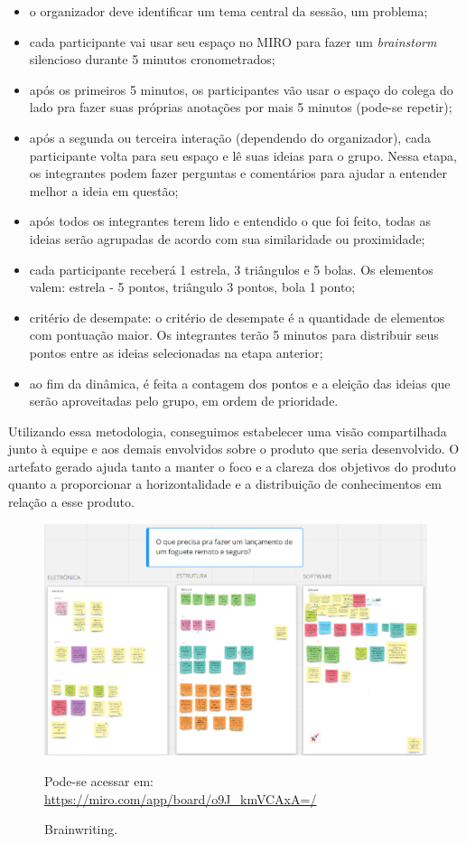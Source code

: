 \begin{itemize}
\item o organizador deve identificar um tema central da sessão, um problema;
\item cada participante vai usar seu espaço no MIRO para fazer um \textit{brainstorm} silencioso durante 5 minutos cronometrados;
\item após os primeiros 5 minutos, os participantes vão usar o espaço do colega do lado pra fazer suas próprias anotações por mais 5 minutos (pode-se repetir);
\item após a segunda ou terceira interação (dependendo do organizador), cada participante volta para seu espaço e lê suas ideias para o grupo. Nessa etapa, os integrantes podem fazer perguntas e comentários para ajudar a entender melhor a ideia em questão;
\item após todos os integrantes terem lido e entendido o que foi feito, todas as ideias serão agrupadas de acordo com sua similaridade ou proximidade;
\item cada participante receberá 1 estrela, 3 triângulos e 5 bolas. Os elementos valem: estrela - 5 pontos, triângulo 3 pontos, bola 1 ponto;
\item critério de desempate: o critério de desempate é a quantidade de elementos com pontuação maior. Os integrantes terão 5 minutos para distribuir seus pontos entre as ideias selecionadas na etapa anterior;
\item ao fim da dinâmica, é feita a contagem dos pontos e a eleição das ideias que serão aproveitadas pelo grupo, em ordem de prioridade.
\end{itemize}

Utilizando essa metodologia, conseguimos estabelecer uma visão compartilhada junto à equipe e aos demais envolvidos sobre o produto que seria desenvolvido. O artefato gerado ajuda tanto a manter o foco e a clareza dos objetivos do produto quanto a proporcionar a horizontalidade e a distribuição de conhecimentos em relação a esse produto.

\begin{figure}[H]
\centering
\includegraphics[scale=0.8]{figuras/miro.png}  
\caption{Brainwriting.}
\footnotesize Pode-se acessar em: \url{https://miro.com/app/board/o9J_kmVCAxA=/}
\label{fig:miro}
\end{figure}


